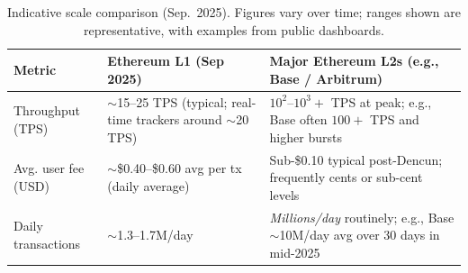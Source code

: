 \begin{table}[htbp]
  \centering
  \scriptsize
  \setlength{\tabcolsep}{6pt}
  \renewcommand{\arraystretch}{1.2}
  \begin{tabularx}{\textwidth}{@{}l X X@{}}
    \toprule
    \textbf{Metric} & \textbf{Ethereum L1 (Sep 2025)} & \textbf{Major Ethereum L2s (e.g., Base / Arbitrum)} \\
    \midrule
    Throughput (TPS) &
      $\sim$15--25 TPS (typical; real-time trackers around $\sim$20 TPS) \cite{chainspect_eth_tps,chainspect_eth_page}
      &
      $10^2$--$10^3{+}$ TPS at peak; e.g., Base often $100{+}$ TPS and higher bursts \cite{chainspect_base_page,l2beat_activity} \\
    \addlinespace[2pt]
    Avg. user fee (USD) &
      $\sim$\$0.40--\$0.60 avg per tx (daily average) \cite{ycharts_avgfee2025,bitinfocharts_eth_fee}
      &
      Sub-\$0.10 typical post-Dencun; frequently cents or sub-cent levels \cite{cointelegraph_dencun_fees,theblock_dencun_fees,galaxy_150d_dencun} \\
    \addlinespace[2pt]
    Daily transactions &
      $\sim$1.3--1.7M/day \cite{ycharts_eth_tx_per_day,bitinfocharts_eth_tx_per_day}
      &
      \emph{Millions/day} routinely; e.g., Base $\sim$10M/day avg over 30 days in mid-2025 \cite{l2beat_activity} \\
    \bottomrule
  \end{tabularx}
  \caption{Indicative scale comparison (Sep.~2025). Figures vary over time; ranges shown are representative, with examples from public dashboards.}
  \label{tab:l1-vs-l2}
\end{table}